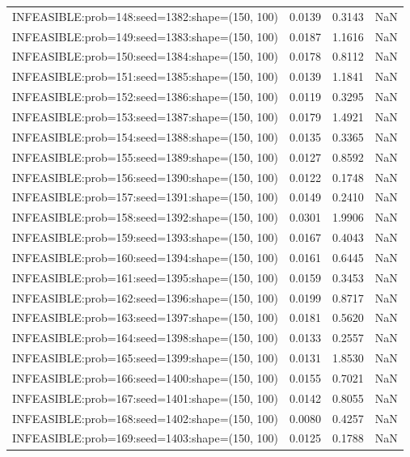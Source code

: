\begin{longtable}{lccc}
INFEASIBLE:prob=148:seed=1382:shape=(150, 100) &   0.0139 &  0.3143 &    NaN \\
INFEASIBLE:prob=149:seed=1383:shape=(150, 100) &   0.0187 &  1.1616 &    NaN \\
INFEASIBLE:prob=150:seed=1384:shape=(150, 100) &   0.0178 &  0.8112 &    NaN \\
INFEASIBLE:prob=151:seed=1385:shape=(150, 100) &   0.0139 &  1.1841 &    NaN \\
INFEASIBLE:prob=152:seed=1386:shape=(150, 100) &   0.0119 &  0.3295 &    NaN \\
INFEASIBLE:prob=153:seed=1387:shape=(150, 100) &   0.0179 &  1.4921 &    NaN \\
INFEASIBLE:prob=154:seed=1388:shape=(150, 100) &   0.0135 &  0.3365 &    NaN \\
INFEASIBLE:prob=155:seed=1389:shape=(150, 100) &   0.0127 &  0.8592 &    NaN \\
INFEASIBLE:prob=156:seed=1390:shape=(150, 100) &   0.0122 &  0.1748 &    NaN \\
INFEASIBLE:prob=157:seed=1391:shape=(150, 100) &   0.0149 &  0.2410 &    NaN \\
INFEASIBLE:prob=158:seed=1392:shape=(150, 100) &   0.0301 &  1.9906 &    NaN \\
INFEASIBLE:prob=159:seed=1393:shape=(150, 100) &   0.0167 &  0.4043 &    NaN \\
INFEASIBLE:prob=160:seed=1394:shape=(150, 100) &   0.0161 &  0.6445 &    NaN \\
INFEASIBLE:prob=161:seed=1395:shape=(150, 100) &   0.0159 &  0.3453 &    NaN \\
INFEASIBLE:prob=162:seed=1396:shape=(150, 100) &   0.0199 &  0.8717 &    NaN \\
INFEASIBLE:prob=163:seed=1397:shape=(150, 100) &   0.0181 &  0.5620 &    NaN \\
INFEASIBLE:prob=164:seed=1398:shape=(150, 100) &   0.0133 &  0.2557 &    NaN \\
INFEASIBLE:prob=165:seed=1399:shape=(150, 100) &   0.0131 &  1.8530 &    NaN \\
INFEASIBLE:prob=166:seed=1400:shape=(150, 100) &   0.0155 &  0.7021 &    NaN \\
INFEASIBLE:prob=167:seed=1401:shape=(150, 100) &   0.0142 &  0.8055 &    NaN \\
INFEASIBLE:prob=168:seed=1402:shape=(150, 100) &   0.0080 &  0.4257 &    NaN \\
INFEASIBLE:prob=169:seed=1403:shape=(150, 100) &   0.0125 &  0.1788 &    NaN \\

\end{longtable}
